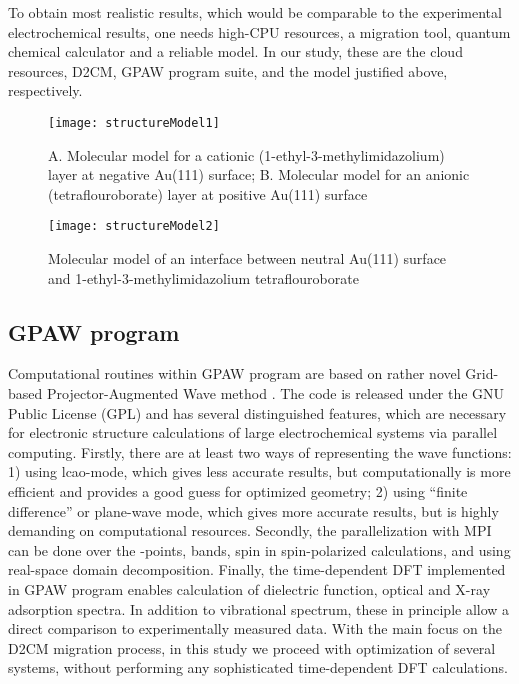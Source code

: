 \documentclass[a4paper,10pt]{article}
\begin{document}
To obtain most realistic results, which would be comparable to the experimental electrochemical results, one needs high-CPU resources, a migration tool, quantum chemical calculator and a reliable model. In our study, these are the cloud resources, D2CM, GPAW program suite, and the model justified above, respectively.

\begin{figure}
\centering
\texttt{[image: structureModel1]}
\caption{A. Molecular model for a cationic (1-ethyl-3-methylimidazolium) layer at negative Au(111) surface; B. Molecular model for an anionic (tetraflouroborate) layer at positive Au(111) surface}
\label{fig:structureModel1}
\end{figure}

\begin{figure}
\centering
\texttt{[image: structureModel2]}
\caption{Molecular model of an interface between neutral Au(111) surface and 1-ethyl-3-methylimidazolium tetraflouroborate}
\label{fig:structureModel2}
\end{figure}

\subsection{GPAW program}
Computational routines within GPAW program are based on rather novel Grid-based Projector-Augmented Wave method \cite{GPAW,GPAW2}. The code is released under the GNU Public License (GPL) and has several distinguished features, which are necessary for electronic structure calculations of large electrochemical systems via parallel computing. 
Firstly, there are at least two ways of representing the wave functions: 1) using lcao-mode, which gives less accurate results, but computationally is more efficient and provides a good guess for optimized geometry; 2) using ``finite difference'' or plane-wave mode, which gives more accurate results, but is highly demanding on computational resources.
Secondly, the parallelization with MPI can be done over the -points, bands, spin in spin-polarized calculations, and using real-space domain decomposition. 
Finally, the time-dependent DFT implemented in GPAW program enables calculation of dielectric function, optical and X-ray adsorption spectra. In addition to vibrational spectrum, these in principle allow a direct comparison to experimentally measured data. With the main focus on the D2CM migration process, in this study we proceed with optimization of several systems, without performing any sophisticated time-dependent DFT calculations. 
\end{document}
